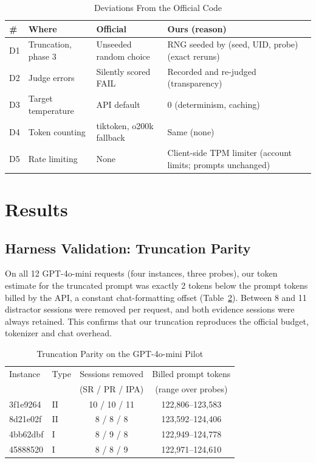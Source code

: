 \documentclass[conference]{IEEEtran}
\begin{document}
\begin{table}[t]
\caption{Deviations From the Official Code}\label{tab:deviations}
\centering\footnotesize\setlength{\tabcolsep}{4pt}
\begin{tabular}{@{}p{}p{}p{}p{}@{}}
\toprule
\# & Where & Official & Ours (reason) \\
\midrule
D1 & Truncation, phase 3 & Unseeded random choice & RNG seeded by (seed, UID, probe) (exact reruns) \\
D2 & Judge errors & Silently scored FAIL & Recorded and re-judged (transparency) \\
D3 & Target temperature & API default & 0 (determinism, caching) \\
D4 & Token counting & tiktoken, o200k fallback & Same (none) \\
D5 & Rate limiting & None & Client-side TPM limiter (account limits; prompts unchanged) \\
\bottomrule
\end{tabular}
\end{table}

\section{Results}
\subsection{Harness Validation: Truncation Parity}\label{sec:results-gpt}
On all 12 GPT-4o-mini requests (four instances, three probes), our token estimate for the truncated prompt was exactly 2 tokens below the prompt tokens billed by the API, a constant chat-formatting offset (Table~\ref{tab:parity}). Between 8 and 11 distractor sessions were removed per request, and both evidence sessions were always retained. This confirms that our truncation reproduces the official budget, tokenizer and chat overhead.

\begin{table}[t]
\caption{Truncation Parity on the GPT-4o-mini Pilot}\label{tab:parity}
\centering\footnotesize\setlength{\tabcolsep}{4pt}
\begin{tabular}{@{}llcc@{}}
\toprule
Instance & Type & Sessions removed & Billed prompt tokens \\
 & & (SR / PR / IPA) & (range over probes) \\
\midrule
3f1e9264 & II & 10 / 10 / 11 & 122{,}806--123{,}583 \\
8d21e02f & II & 8 / 8 / 8 & 123{,}592--124{,}406 \\
4bb62dbf & I & 8 / 9 / 8 & 122{,}949--124{,}778 \\
45888520 & I & 8 / 8 / 9 & 122{,}971--124{,}610 \\
\bottomrule
\end{tabular}
\end{table}
\end{document}
